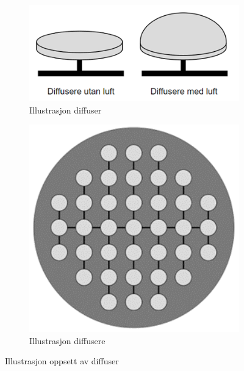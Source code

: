 \begin{figure}[htbp]
    \centering
    \begin{subfigure}[b]{0.3\textwidth}
        \centering
        \includegraphics[width=1\textwidth]{Figurar/DiffusereMedOgUtanLuft.png}
        \caption{Illustrasjon diffuser}\label{fig:subfig1}
    \end{subfigure}
    \hfill
    \begin{subfigure}[b]{0.3\textwidth}
        \centering
        \includegraphics[width=1\textwidth]{Figurar/DiffuserFraTopp.png}
        \caption{Illustrasjon diffusere}\label{fig:subfig2}
    \end{subfigure}
    \caption{Illustrasjon oppsett av diffuser}\label{fig:Illustrasjon-Diffuser}
\end{figure}

